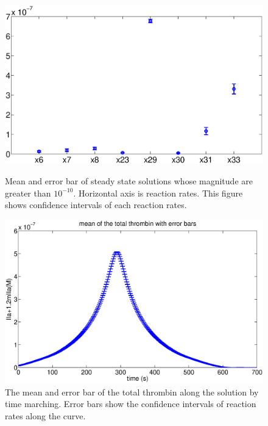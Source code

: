 \begin{figure}
\begin{center}
  \includegraphics[width=5in]{figures/steady.eps}
\caption{Mean and error bar of steady state solutions whose
magnitude are greater than $10^{-10}$. Horizontal axis is reaction
rates. This figure shows confidence intervals of each reaction
rates.} \label{Fig:steady}

  \includegraphics[width=5in]{figures/mean.eps}
\caption{The mean and error bar of the total thrombin along the
solution by time marching. Error bars show the confidence intervals
of reaction rates along the curve. }\label{Fig:mean}


\end{center}
\end{figure}
